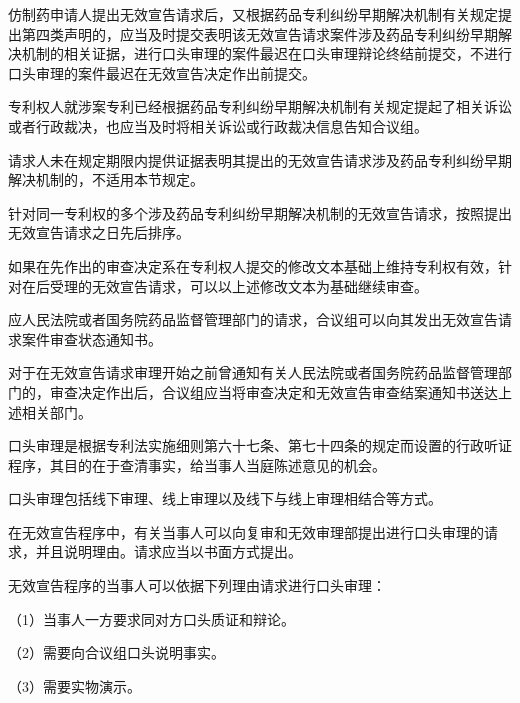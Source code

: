 仿制药申请人提出无效宣告请求后，又根据药品专利纠纷早期解决机制有关规定提出第四类声明的，应当及时提交表明该无效宣告请求案件涉及药品专利纠纷早期解决机制的相关证据，进行口头审理的案件最迟在口头审理辩论终结前提交，不进行口头审理的案件最迟在无效宣告决定作出前提交。

{\setlength{\parindent}{30.8bp}专利权人就涉案专利已经根据药品专利纠纷早期解决机制有关规定提起了相关诉讼或者行政裁决，也应当及时将相关诉讼或行政裁决信息告知合议组。\par}

请求人未在规定期限内提供证据表明其提出的无效宣告请求涉及药品专利纠纷早期解决机制的，不适用本节规定。

针对同一专利权的多个涉及药品专利纠纷早期解决机制的无效宣告请求，按照提出无效宣告请求之日先后排序。

如果在先作出的审查决定系在专利权人提交的修改文本基础上维持专利权有效，针对在后受理的无效宣告请求，可以以上述修改文本为基础继续审查。

应人民法院或者国务院药品监督管理部门的请求，合议组可以向其发出无效宣告请求案件审查状态通知书。

对于在无效宣告请求审理开始之前曾通知有关人民法院或者国务院药品监督管理部门的，审查决定作出后，合议组应当将审查决定和无效宣告审查结案通知书送达上述相关部门。

口头审理是根据专利法实施细则第六十七条、第七十四条的规定而设置的行政听证程序，其目的在于查清事实，给当事人当庭陈述意见的机会。

口头审理包括线下审理、线上审理以及线下与线上审理相结合等方式。

在无效宣告程序中，有关当事人可以向复审和无效审理部提出进行口头审理的请求，并且说明理由。请求应当以书面方式提出。

无效宣告程序的当事人可以依据下列理由请求进行口头审理：

{\setlength{\parindent}{17.1bp}（1）当事人一方要求同对方口头质证和辩论。\par}

{\setlength{\parindent}{17.1bp}（2）需要向合议组口头说明事实。\par}

{\setlength{\parindent}{17.1bp}（3）需要实物演示。\par}

